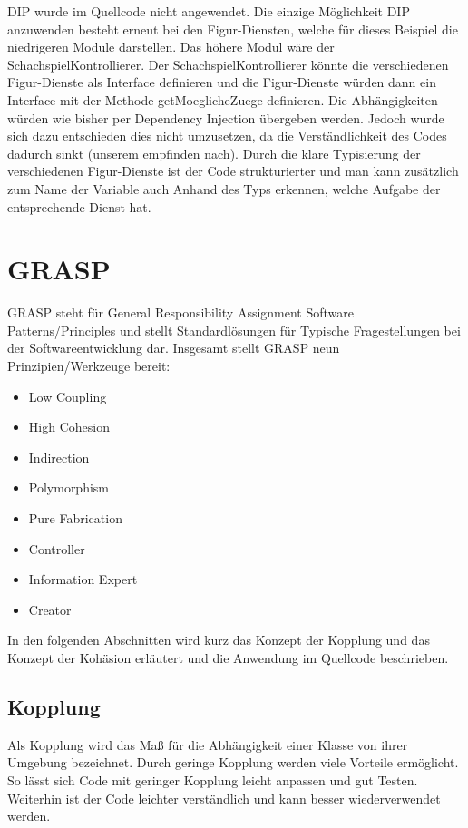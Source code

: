 DIP wurde im Quellcode nicht angewendet. Die einzige Möglichkeit DIP anzuwenden besteht erneut bei den Figur-Diensten, welche für dieses Beispiel die niedrigeren Module darstellen. Das höhere Modul wäre der SchachspielKontrollierer. Der SchachspielKontrollierer könnte die verschiedenen Figur-Dienste als Interface definieren und die Figur-Dienste würden dann ein Interface mit der Methode getMoeglicheZuege definieren. Die Abhängigkeiten würden wie bisher per Dependency Injection übergeben werden. Jedoch wurde sich dazu entschieden dies nicht umzusetzen, da die Verständlichkeit des Codes dadurch sinkt (unserem empfinden nach). Durch die klare Typisierung der verschiedenen Figur-Dienste ist der Code strukturierter und man kann zusätzlich zum Name der Variable auch Anhand des Typs erkennen, welche Aufgabe der entsprechende Dienst hat.

\section{GRASP}
GRASP steht für General Responsibility Assignment Software Patterns/Principles und stellt Standardlösungen für Typische Fragestellungen bei der Softwareentwicklung dar. Insgesamt stellt GRASP neun Prinzipien/Werkzeuge bereit:
\begin{itemize}
    \item Low Coupling
    \item High Cohesion
    \item Indirection
    \item Polymorphism
    \item Pure Fabrication
    \item Controller
    \item Information Expert
    \item Creator
\end{itemize}

In den folgenden Abschnitten wird kurz das Konzept der Kopplung und das Konzept der Kohäsion erläutert und die Anwendung im Quellcode beschrieben.

\subsection{Kopplung}
Als Kopplung wird das Maß für die Abhängigkeit einer Klasse von ihrer Umgebung bezeichnet. Durch geringe Kopplung werden viele Vorteile ermöglicht. So lässt sich Code mit geringer Kopplung leicht anpassen und gut Testen. Weiterhin ist der Code leichter verständlich und kann besser wiederverwendet werden.

